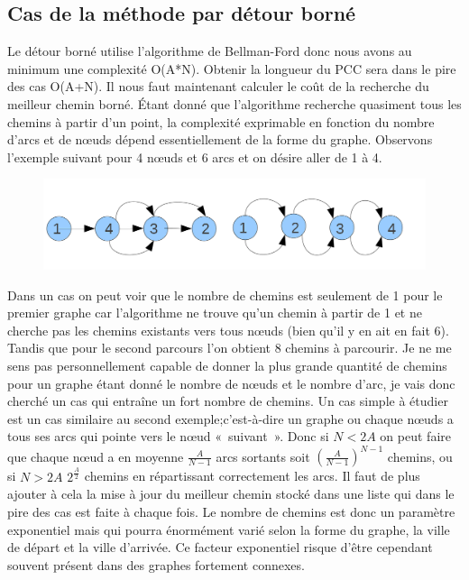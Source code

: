 \subsection{Cas de la méthode par détour borné}
Le détour borné utilise l'algorithme de Bellman-Ford donc nous avons au minimum une complexité O(A*N). Obtenir la longueur du PCC sera dans le pire des cas O(A+N).
Il nous faut maintenant calculer le coût de la recherche du meilleur chemin borné. Étant donné que l'algorithme recherche quasiment tous les chemins à partir d'un point, la complexité exprimable en fonction du nombre d'arcs et de nœuds dépend essentiellement de la forme du graphe. Observons l'exemple suivant pour 4 nœuds et 6 arcs et on désire aller de 1 à 4.
\begin{figure}[!h] 
\begin{center}
  \includegraphics[scale=0.40]{Graphe.png}
\end{center}
\end{figure} 
Dans un cas on peut voir que le nombre de chemins est seulement de 1 pour le premier graphe car l'algorithme ne trouve qu'un chemin à partir de 1 et ne cherche pas les chemins existants vers tous nœuds (bien qu'il y en ait en fait 6).  Tandis que pour le  second parcours l'on obtient 8 chemins à parcourir.
Je ne me sens pas personnellement capable de donner la plus grande quantité de chemins pour un graphe étant donné le nombre de nœuds et le nombre d'arc, je vais donc cherché un  cas qui entraîne un fort nombre de chemins. Un cas simple à étudier est un cas similaire au second exemple;c'est-à-dire un graphe ou chaque nœuds a tous ses arcs qui pointe vers le nœud « suivant ». Donc si $N<2A$ on peut faire que chaque nœud a en moyenne $\frac{A}{N-1}$ arcs sortants soit $(\frac{A}{N-1})^{N-1}$ chemins, ou si $N>2A$ $2^{\frac{A}{2}}$ chemins en répartissant correctement les arcs. Il faut de plus ajouter à cela la mise à jour du meilleur chemin stocké dans une liste qui dans le pire des cas est faite à chaque fois.
Le nombre de chemins est donc un paramètre exponentiel mais qui pourra énormément varié selon la forme du graphe, la ville de départ et la ville d'arrivée. Ce facteur exponentiel risque d'être cependant souvent présent dans des graphes fortement connexes.

\clearpage


